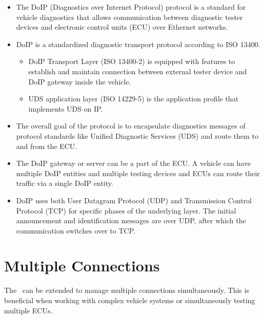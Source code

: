 \begin{itemize}

\item The DoIP (Diagnostics over Internet Protocol) protocol is a standard for vehicle diagnostics that allows communication 
between diagnostic tester devices and electronic control units (ECU) over Ethernet networks.

\item DoIP is a standardized diagnostic transport protocol according to ISO 13400.
    \begin{itemize}

    \item DoIP Transport Layer (ISO 13400-2) is equipped with features to establish and maintain connection between external 
    tester device and DoIP gateway inside the vehicle.
    
    \item UDS application layer (ISO 14229-5) is the application profile that implements UDS on IP.

    \end{itemize}

\item The overall goal of the protocol is to encapsulate diagnostics messages of protocol standards like Unified Diagnostic Services (UDS)
and route them to and from the ECU.

\item The DoIP gateway or server can be a part of the ECU. A vehicle can have multiple DoIP entities and multiple testing devices and 
ECUs can route their traffic via a single DoIP entity. 

\item DoIP uses both User Datagram Protocol (UDP) and Transmission Control Protocol (TCP) for specific phases of the underlying layer. 
The initial announcement and identification messages are over UDP, after which the communication switches over to TCP.

\end{itemize}


\section{Multiple Connections}
The \pkg\ can be extended to manage multiple connections simultaneously.
This is beneficial when working with complex vehicle systems or simultaneously
testing multiple ECUs.

